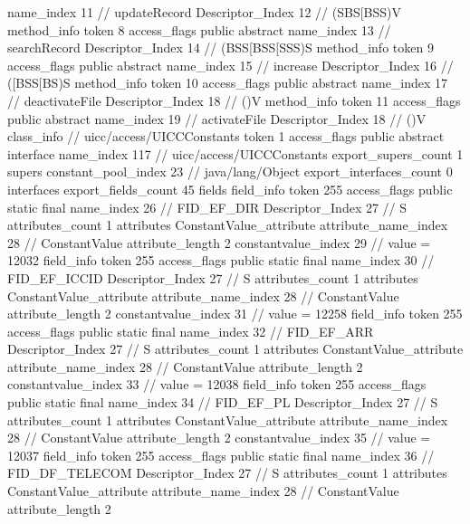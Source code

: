 {{{{{					name_index	11		// updateRecord
					Descriptor_Index	12		// (SBS[BSS)V
				}
				method_info {
					token	8
					access_flags	public abstract
					name_index	13		// searchRecord
					Descriptor_Index	14		// (BSS[BSS[SSS)S
				}
				method_info {
					token	9
					access_flags	public abstract
					name_index	15		// increase
					Descriptor_Index	16		// ([BSS[BS)S
				}
				method_info {
					token	10
					access_flags	public abstract
					name_index	17		// deactivateFile
					Descriptor_Index	18		// ()V
				}
				method_info {
					token	11
					access_flags	public abstract
					name_index	19		// activateFile
					Descriptor_Index	18		// ()V
				}
			}
		}
		class_info {		// uicc/access/UICCConstants
			token	1
			access_flags	public abstract interface
			name_index	117		// uicc/access/UICCConstants
			export_supers_count	1
			supers {
				constant_pool_index	23		// java/lang/Object
			}
			export_interfaces_count	0
			interfaces {
			}
			export_fields_count	45
			fields {
			field_info {
				token	255
				access_flags	public static final
				name_index	26		// FID_EF_DIR
				Descriptor_Index	27		// S
				attributes_count	1
				attributes {
				ConstantValue_attribute {
					attribute_name_index	28		// ConstantValue
					attribute_length	2
					constantvalue_index	29		// value = 12032
				}
				}
			}
			field_info {
				token	255
				access_flags	public static final
				name_index	30		// FID_EF_ICCID
				Descriptor_Index	27		// S
				attributes_count	1
				attributes {
				ConstantValue_attribute {
					attribute_name_index	28		// ConstantValue
					attribute_length	2
					constantvalue_index	31		// value = 12258
				}
				}
			}
			field_info {
				token	255
				access_flags	public static final
				name_index	32		// FID_EF_ARR
				Descriptor_Index	27		// S
				attributes_count	1
				attributes {
				ConstantValue_attribute {
					attribute_name_index	28		// ConstantValue
					attribute_length	2
					constantvalue_index	33		// value = 12038
				}
				}
			}
			field_info {
				token	255
				access_flags	public static final
				name_index	34		// FID_EF_PL
				Descriptor_Index	27		// S
				attributes_count	1
				attributes {
				ConstantValue_attribute {
					attribute_name_index	28		// ConstantValue
					attribute_length	2
					constantvalue_index	35		// value = 12037
				}
				}
			}
			field_info {
				token	255
				access_flags	public static final
				name_index	36		// FID_DF_TELECOM
				Descriptor_Index	27		// S
				attributes_count	1
				attributes {
				ConstantValue_attribute {
					attribute_name_index	28		// ConstantValue
					attribute_length	2
}}}}}}}
